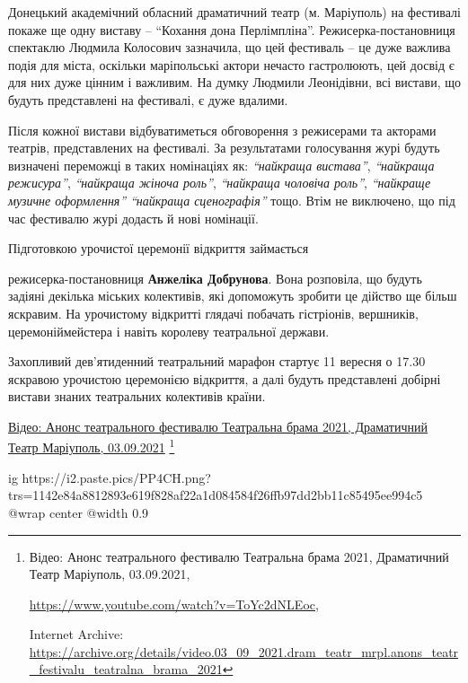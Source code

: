 Донецький академічний обласний драматичний театр (м. Маріуполь) на фестивалі
покаже ще одну виставу – \enquote{Кохання дона Перлімпліна}. Режисерка-постановниця
спектаклю Людмила Колосович зазначила, що цей фестиваль – це дуже важлива подія
для міста, оскільки маріпольські актори нечасто гастролюють, цей досвід є для
них дуже цінним і важливим. На думку Людмили Леонідівни, всі вистави, що будуть
представлені на фестивалі, є дуже вдалими.

Після кожної вистави відбуватиметься обговорення з режисерами та акторами
театрів, представлених на фестивалі. За результатами голосування журі будуть
визначені переможці в таких номінаціях як: \emph{\enquote{найкраща вистава}}, \emph{\enquote{найкраща
режисура}}, \emph{\enquote{найкраща жіноча роль}}, \emph{\enquote{найкраща чоловіча роль}}, \emph{\enquote{найкраще музичне
оформлення}} \emph{\enquote{найкраща сценографія}} тощо. Втім не виключено, що під час
фестивалю журі додасть й нові номінації.

Підготовкою урочистої церемонії відкриття займається\par\noindent режисерка-постановниця
\textbf{Анжеліка Добрунова}. Вона розповіла, що будуть задіяні декілька міських
колективів, які допоможуть зробити це дійство ще більш яскравим. На урочистому
відкритті глядачі побачать гістріонів, вершників, церемоніймейстера і навіть
королеву  театральної держави.

Захопливий дев'ятиденний театральний марафон стартує 11 вересня о 17.30
яскравою урочистою церемонією відкриття, а далі будуть представлені добірні
вистави знаних театральних колективів країни.

\href{https://archive.org/details/video.03_09_2021.dram_teatr_mrpl.anons_teatr_festivalu_teatralna_brama_2021}{%
Відео: Анонс театрального фестивалю Театральна брама 2021, Драматичний Театр Маріуполь, 03.09.2021}%
\footnote{%
Відео: Анонс театрального фестивалю Театральна брама 2021, Драматичний Театр Маріуполь, 03.09.2021, %
\par\url{https://www.youtube.com/watch?v=ToYc2dNLEoc}, \par%
Internet Archive: \url{https://archive.org/details/video.03_09_2021.dram_teatr_mrpl.anons_teatr_festivalu_teatralna_brama_2021}
}

\ifcmt
  ig https://i2.paste.pics/PP4CH.png?trs=1142e84a8812893e619f828af22a1d084584f26ffb97dd2bb11c85495ee994c5
  @wrap center
  @width 0.9
\fi

